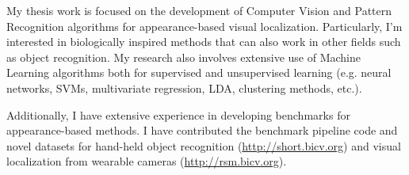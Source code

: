 My thesis work is focused on the development of Computer Vision and Pattern Recognition algorithms for appearance-based visual localization. Particularly, I'm interested in biologically inspired methods that can also work in other fields such as object recognition. My research also involves extensive use of Machine Learning algorithms both for supervised and unsupervised learning (e.g. neural networks, SVMs, multivariate regression, LDA, clustering methods, etc.).

Additionally, I have extensive experience in developing benchmarks for appearance-based methods. I have contributed the benchmark pipeline code and novel datasets for hand-held object recognition (\url{http://short.bicv.org}) and visual localization from wearable cameras (\url{http://rsm.bicv.org}).

